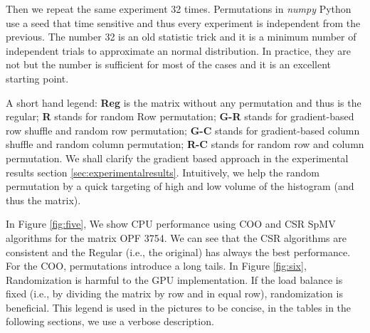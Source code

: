 \documentclass[manuscript,screen]{acmart}
\begin{document}
Then we repeat the same experiment 32 times. Permutations in {\em
  numpy} Python use a seed that time sensitive and thus every
experiment is independent from the previous. The number 32 is an old
statistic trick and it is a minimum number of independent trials to
approximate an normal distribution. In practice, they are not but the
number is sufficient for most of the cases and it is an excellent
starting point.

A short hand legend: {\bf Reg} is the matrix without any permutation
and thus is the regular; {\bf R} stands for random Row permutation;
{\bf G-R} stands for gradient-based row shuffle and random row
permutation; {\bf G-C} stands for gradient-based column shuffle and
random column permutation; {\bf R-C} stands for random row and column
permutation. We shall clarify the gradient based approach in the
experimental results section
\ref{sec:experimentalresults}. Intuitively, we help the random
permutation by a quick targeting of high and low volume of the
histogram (and thus the matrix).


In Figure \ref{fig:five}, We show CPU performance using COO and CSR
SpMV algorithms for the matrix OPF 3754. We can see that the CSR
algorithms are consistent and the Regular (i.e., the original) has
always the best performance. For the COO, permutations introduce a
long tails. In Figure \ref{fig:six}, Randomization is harmful to the
GPU implementation. If the load balance is fixed (i.e., by dividing
the matrix by row and in equal row), randomization is beneficial. This
legend is used in the pictures to be concise, in the tables in the
following sections, we use a verbose description.



\end{document}
